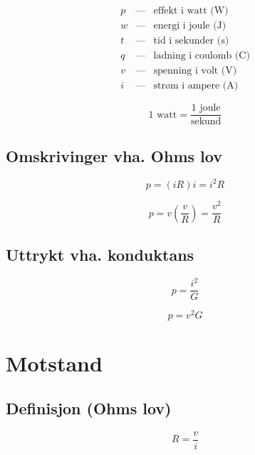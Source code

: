 \documentclass[norsk, a4paper, 12pt, twoside, titlepage]{article}
\begin{document}
\begin{eqnarray*}
p & \mbox{---} & \mbox{effekt i watt (W)} \\
w & \mbox{---} & \mbox{energi i joule (J)} \\
t & \mbox{---} & \mbox{tid i sekunder (s)} \\
q & \mbox{---} & \mbox{ladning i coulomb (C)} \\
v & \mbox{---} & \mbox{spenning i volt (V)} \\
i & \mbox{---} & \mbox{strøm i ampere (A)}
\end{eqnarray*}

\bigskip

\begin{equation}
1 \mbox{ watt} = \frac{\mbox{1 joule}}{\mbox{sekund}}
\end{equation}

\subsection{Omskrivinger vha. Ohms lov}
\begin{equation}
p = (iR)i = i^{2}R
\end{equation}

\begin{equation}
p = v \left(\frac{v}{R}\right) = \frac{v^{2}}{R}
\end{equation}

\subsection{Uttrykt vha. konduktans}
\begin{equation}
p = \frac{i^{2}}{G}
\end{equation}

\begin{equation}
p = v^{2}G
\end{equation}


\newpage
\section{Motstand}
\subsection{Definisjon (Ohms lov)}
\begin{equation}
R = \frac{v}{i}
\end{equation}
\end{document}

